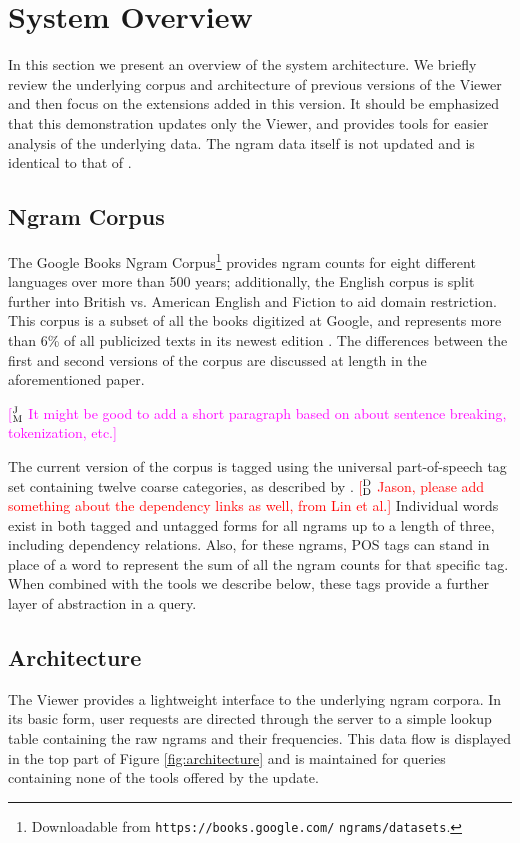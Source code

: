 \documentclass[11pt]{article}
\newcommand{\ddcomment}[1]{\textcolor{red}{[$^{\textsc{D}}_{\textsc{D}}$ #1]}}
\newcommand{\jmcomment}[1]{\textcolor{magenta}{[$^{\textsc{J}}_{\textsc{M}}$ #1]}}
\begin{document}
\section{System Overview}
\label{sec:overview}

In this section we present an overview of the system architecture. We briefly review the underlying corpus and architecture of previous versions of the Viewer \cite{culturomics,lin2012syntactic} and then focus on the extensions added in this version. It should be emphasized that this demonstration updates only the Viewer, and provides tools for easier analysis of the underlying data. The ngram data itself is not updated and is identical to that of .


\subsection{Ngram Corpus}
	The Google Books Ngram Corpus\footnote{Downloadable from \texttt{https://books.google.com/} \texttt{ngrams/datasets}.} provides ngram counts for eight different languages over more than 500 years; additionally, the English corpus is split further into British vs. American English and Fiction to aid domain restriction. This corpus is a subset of all the books digitized at Google, and represents more than 6\% of all publicized texts in its newest edition \cite{lin2012syntactic}. The differences between the first and second versions of the corpus are discussed at length in the aforementioned paper.
	
\jmcomment{It might be good to add a short paragraph based on \newcite{lin2012syntactic} about sentence breaking, tokenization, etc.}

The current version of the corpus is tagged using the universal part-of-speech tag set containing twelve coarse categories, as described by . \ddcomment{Jason, please add something about the dependency links as well, from Lin et al.} Individual words exist in both tagged and untagged forms for all ngrams up to a length of three, including dependency relations. Also, for these ngrams, POS tags can stand in place of a word to represent the sum of all the ngram counts for that specific tag. When combined with the tools we describe below, these tags provide a further layer of abstraction in a query.
\vspace{2.5em}


\subsection{Architecture}
The Viewer provides a lightweight interface to the underlying ngram corpora. In its basic form, user requests are directed through the server to a simple lookup table containing the raw ngrams and their frequencies. This data flow is displayed in the top part of Figure \ref{fig:architecture} and is maintained for queries containing none of the tools offered by the update.
\end{document}
